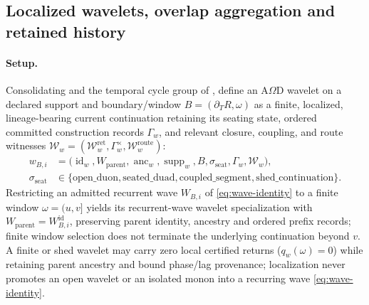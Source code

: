 \subsection{Localized wavelets, overlap aggregation and retained history}
\label{subsec:aod-wavelet-continuation}
\paragraph{Setup.}
Consolidating  and the temporal cycle group
of , define an A\(\Omega\)D wavelet on a
declared support and boundary/window \(B=(\partial_T R,\omega)\) as a finite,
localized, lineage-bearing current continuation retaining its seating state,
ordered committed construction records \(\Gamma_w\), and relevant closure,
coupling, and route witnesses \(\mathcal W_w=(\mathcal W_w^{\mathrm{ret}},\Gamma^\times_w,\mathcal W_w^{\mathrm{route}})\):
\begin{equation}
\begin{split}
w_{B,i}&=\bigl(\operatorname{id}_w,W_{\mathrm{parent}},\operatorname{anc}_w,\operatorname{supp}_w,B,\sigma_{\mathrm{seat}},\Gamma_w,\mathcal W_w\bigr),\\
\sigma_{\mathrm{seat}}&\in\{\mathrm{open\_duon},\mathrm{seated\_duad},\mathrm{coupled\_segment},\mathrm{shed\_continuation}\}.
\end{split}
\label{eq:aod-wavelet-continuation}
\end{equation}
Restricting an admitted recurrent wave \(W_{B,i}\) of \eqref{eq:wave-identity}
to a finite window \(\omega=(u,v]\) yields its recurrent-wave wavelet
specialization with \(W_{\mathrm{parent}}=W^{\mathrm{id}}_{B,i}\), preserving
parent identity, ancestry and ordered prefix records; finite window selection
does not terminate the underlying continuation beyond \(v\). A finite or shed
wavelet may carry zero local certified returns (\(q_w(\omega)=0\)) while
retaining parent ancestry and bound phase/lag provenance; localization never
promotes an open wavelet or an isolated monon into a recurring wave
\eqref{eq:wave-identity}.

